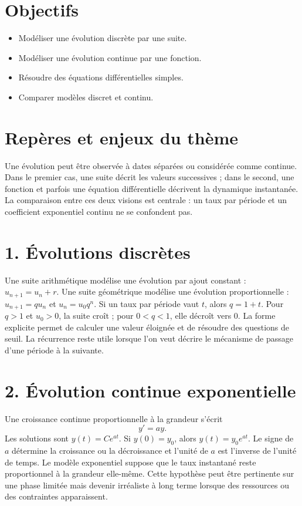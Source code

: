 \section{Objectifs}
\begin{itemize}
\item Modéliser une évolution discrète par une suite.
\item Modéliser une évolution continue par une fonction.
\item Résoudre des équations différentielles simples.
\item Comparer modèles discret et continu.
\end{itemize}
\section{Repères et enjeux du thème}
Une évolution peut être observée à dates séparées ou considérée comme continue. Dans le premier cas, une suite décrit les valeurs successives ; dans le second, une fonction et parfois une équation différentielle décrivent la dynamique instantanée. La comparaison entre ces deux visions est centrale : un taux par période et un coefficient exponentiel continu ne se confondent pas.
\section{1. Évolutions discrètes}
Une suite arithmétique modélise une évolution par ajout constant : $u_{n+1}=u_n+r$. Une suite géométrique modélise une évolution proportionnelle : $u_{n+1}=qu_n$ et $u_n=u_0q^n$. Si un taux par période vaut $t$, alors $q=1+t$.
Pour $q>1$ et $u_0>0$, la suite croît ; pour $0<q<1$, elle décroît vers $0$. La forme explicite permet de calculer une valeur éloignée et de résoudre des questions de seuil. La récurrence reste utile lorsque l'on veut décrire le mécanisme de passage d'une période à la suivante.
\section{2. Évolution continue exponentielle}
Une croissance continue proportionnelle à la grandeur s'écrit
\[
y'=ay.
\]
Les solutions sont $y(t)=Ce^{at}$. Si $y(0)=y_0$, alors $y(t)=y_0e^{at}$. Le signe de $a$ détermine la croissance ou la décroissance et l'unité de $a$ est l'inverse de l'unité de temps.
Le modèle exponentiel suppose que le taux instantané reste proportionnel à la grandeur elle-même. Cette hypothèse peut être pertinente sur une phase limitée mais devenir irréaliste à long terme lorsque des ressources ou des contraintes apparaissent.
